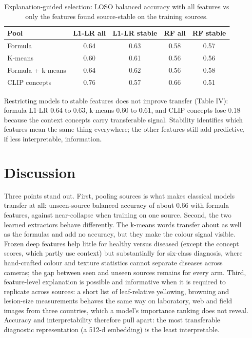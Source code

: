 \documentclass[conference]{IEEEtran}
\begin{document}
\begin{table}[t]
\centering
\caption{Explanation-guided selection: LOSO balanced accuracy with all features vs only the features found source-stable on the training sources.}
\label{tab:sel}
\footnotesize
\begin{tabular}{lcccc}
\toprule
\textbf{Pool} & \textbf{L1-LR all} & \textbf{L1-LR stable} & \textbf{RF all} & \textbf{RF stable} \\
\midrule
Formula & 0.64 & 0.63 & 0.58 & 0.57 \\
K-means & 0.60 & 0.61 & 0.56 & 0.56 \\
Formula + k-means & 0.64 & 0.62 & 0.56 & 0.58 \\
CLIP concepts & 0.76 & 0.57 & 0.66 & 0.51 \\
\bottomrule
\end{tabular}
\end{table}
Restricting models to stable features does not improve transfer (Table IV): formula L1-LR 0.64 to 0.63, k-means 0.60 to 0.61, and CLIP concepts lose 0.18 because the context concepts carry transferable signal. Stability identifies which features mean the same thing everywhere; the other features still add predictive, if less interpretable, information.

\section{Discussion}
Three points stand out. First, pooling sources is what makes classical models transfer at all: unseen-source balanced accuracy of about 0.66 with formula features, against near-collapse when training on one source. Second, the two learned extractors behave differently. The k-means words transfer about as well as the formulas and add no accuracy, but they make the colour signal visible. Frozen deep features help little for healthy versus diseased (except the concept scores, which partly use context) but substantially for six-class diagnosis, where hand-crafted colour and texture statistics cannot separate diseases across cameras; the gap between seen and unseen sources remains for every arm. Third, feature-level explanation is possible and informative when it is required to replicate across sources: a short list of leaf-relative yellowing, browning and lesion-size measurements behaves the same way on laboratory, web and field images from three countries, which a model's importance ranking does not reveal. Accuracy and interpretability therefore pull apart: the most transferable diagnostic representation (a 512-d embedding) is the least interpretable.
\end{document}
